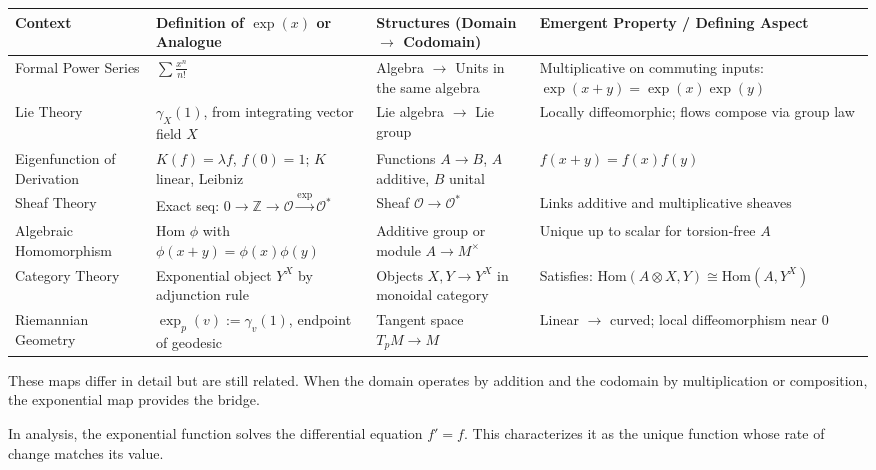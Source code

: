 \begin{center}
\renewcommand{\arraystretch}{1.5}
\setlength{\tabcolsep}{2pt}
\footnotesize
\begin{tabular}{|>{\centering\arraybackslash}m{2.0cm}|>{\centering\arraybackslash}m{2.8cm}|>{\centering\arraybackslash}m{3.8cm}|>{\centering\arraybackslash}m{4.2cm}|}
\hline
\textbf{Context} &
\textbf{Definition of \( \exp(x) \) or Analogue} &
\textbf{Structures (Domain \( \to \) Codomain)} &
\textbf{Emergent Property / Defining Aspect} \\
\hline
Formal Power Series &
\( \sum \frac{x^n}{n!} \) &
Algebra \( \to \) Units in the same algebra &
Multiplicative on commuting inputs: \( \exp(x+y) = \exp(x)\exp(y) \) \\
\hline
Lie Theory &
\( \gamma_X(1) \), from integrating vector field \( X \) &
Lie algebra \( \to \) Lie group &
Locally diffeomorphic; flows compose via group law \\
\hline
Eigenfunction of Derivation &
\( K(f) = \lambda f \), \( f(0) = 1 \); \( K \) linear, Leibniz &
Functions \( A \to B \), \( A \) additive, \( B \) unital &
\( f(x+y) = f(x)f(y) \) \\
\hline
Sheaf Theory &
Exact seq: \( 0 \to \mathbb{Z} \to \mathcal{O} \xrightarrow{\exp} \mathcal{O}^* \) &
Sheaf \( \mathcal{O} \to \mathcal{O}^* \) &
Links additive and multiplicative sheaves \\
\hline
Algebraic Homomorphism &
Hom \( \phi \) with \( \phi(x+y) = \phi(x)\phi(y) \) &
Additive group or module \( A \to M^\times \) &
Unique up to scalar for torsion-free \( A \) \\
\hline
Category Theory &
Exponential object \( Y^X \) by adjunction rule &
Objects \( X, Y \to Y^X \) in monoidal category &
Satisfies: \( \mathrm{Hom}(A \otimes X, Y) \cong \mathrm{Hom}(A, Y^X) \) \\
\hline
Riemannian Geometry &
\( \exp_p(v) := \gamma_v(1) \), endpoint of geodesic &
Tangent space \( T_p M \to M \) &
Linear \(\to\) curved; local diffeomorphism near \( 0 \) \\
\hline
\end{tabular}
\end{center}

These maps differ in detail but are still related. When the domain operates by addition and the codomain by multiplication or composition, the exponential map provides the bridge.

In analysis, the exponential function solves the differential equation \( f' = f \). This characterizes it as the unique function whose rate of change matches its value.

